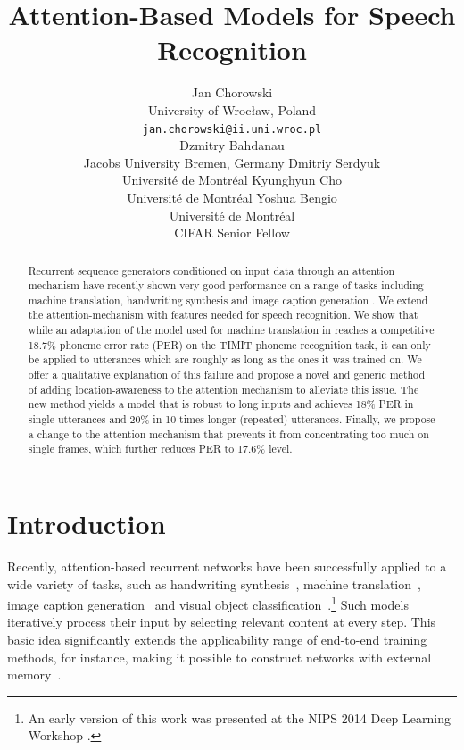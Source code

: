 \documentclass{article} %
\title{Attention-Based Models for Speech Recognition}
\author{
Jan Chorowski \\
University of Wroc\l{}aw, Poland\\
\texttt{jan.chorowski@ii.uni.wroc.pl} \\
\And
Dzmitry Bahdanau \\
Jacobs University Bremen, Germany
\And
Dmitriy  Serdyuk \\
Universit\'{e} de Montr\'{e}al
\And
Kyunghyun Cho\\
Universit\'{e} de Montr\'{e}al
\And
Yoshua Bengio \\
Universit\'{e} de Montr\'{e}al \\
CIFAR Senior Fellow
}
\begin{document}
\maketitle

\begin{abstract}
Recurrent sequence generators conditioned on input data through an attention
mechanism have recently shown very good performance on a range of tasks
including machine translation, handwriting synthesis
\cite{graves_generating_2013,bahdanau_neural_2014} and image caption generation
\cite{xu_show_2015}. We extend the attention-mechanism with features needed for speech
recognition. We show that while an adaptation of the model used for machine
translation in \cite{bahdanau_neural_2014} reaches a competitive 18.7\% phoneme
error rate (PER) on the TIMIT phoneme recognition task, it can only be applied to utterances which are
roughly as long as the ones it was trained on. We offer a qualitative
explanation of this failure 
and propose a novel and generic method of adding
location-awareness to the attention mechanism to alleviate this issue. The new
method yields a model that is robust to long inputs and achieves 18\% PER in single
utterances and 20\% in 10-times longer (repeated) utterances.  Finally, we
propose a change to the attention mechanism that prevents it from concentrating
too much on single frames, which further reduces PER to 17.6\% level. 
\end{abstract}

\section{Introduction}

Recently, attention-based recurrent networks have been successfully applied to a
wide variety of tasks, such as handwriting
synthesis~\cite{graves_generating_2013}, machine
translation~\cite{bahdanau_neural_2014}, image caption
generation~\cite{xu_show_2015} and  visual object
classification~\cite{mnih_2014}.\footnote{%
  An early version of this work was presented at the NIPS 2014 Deep Learning
  Workshop \cite{chorowski_2014}.
}
Such models iteratively process their input by selecting relevant content at
every step. This basic idea significantly extends the applicability range of
end-to-end training methods, for instance, making it possible to construct
networks with external memory~\cite{graves_2014,weston_2014}.
\end{document}
